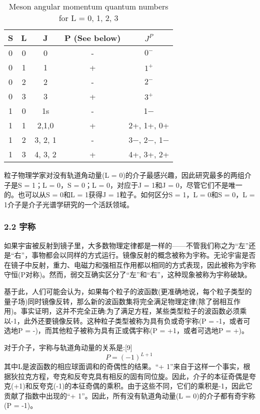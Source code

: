 \begin{table}[ht]
\centering
\caption{Meson angular momentum quantum numbers for L = 0, 1, 2, 3}\label{tab_JZ1}
\begin{tabular}{|c|c|c|c|c|}
\hline
S & L    & J & P
(See below) &$ J^P$ \\
\hline
0 & 0& 0 & - &$ 0^-$\\
\hline
0 & 1 & 1& + & $1^+$ \\
\hline
0 & 2 & 2 & - & $2^-$ \\
\hline
0 & 3 & 3 & + &$3^+$ \\
\hline
1& 0 & 1s & - & 1− \\
\hline
1 &1 & 2,1,0 &+ & 2+, 1+, 0+\\
\hline
1 & 2 & 3, 2, 1 & - & 3−, 2−, 1−  \\
\hline
1 & 3 & 4, 3, 2 & +& 4+, 3+, 2+ \\
\hline
\end{tabular}
\end{table}
粒子物理学家对没有轨道角动量(L = 0)的介子最感兴趣，因此研究最多的两组介子是S = 1；L = 0，S = 0；L = 0，对应于J = 1和J = 0，尽管它们不是唯一的。也可以从S = 0和L = 1获得J = 1粒子。如何区分S = 1，L = 0和S = 0，L = 1介子是介子光谱学研究的一个活跃领域。
\subsubsection{2.2 宇称}
如果宇宙被反射到镜子里，大多数物理定律都是一样的——不管我们称之为“左”还是“右”，事物都会以同样的方式运行。镜像反射的概念被称为宇称。无论宇宙是否在镜子中反射，重力、电磁力和强相互作用都以相同的方式表现，因此被称为宇称守恒(P对称)。然而，弱交互确实区分了“左”和“右”，这种现象被称为宇称破缺。

基于此，人们可能会认为，如果每个粒子的波函数(更准确地说，每个粒子类型的量子场)同时镜像反转，那么新的波函数集将完全满足物理定律(除了弱相互作用)。事实证明，这并不完全正确:为了满足方程，某些类型粒子的波函数必须乘以-1，此外还要镜像反转。这种粒子类型被称为具有负或奇宇称(P = -1，或者可选地P = -)，而其他粒子被称为具有正或偶宇称(P = +1，或者可选地P = +)。

对于介子，宇称与轨道角动量的关系是:[9]\begin{equation}
P=(-1)^{L+1}~
\end{equation}
其中L是波函数的相应球面调和的奇偶性的结果。“+ 1”来自于这样一个事实，根据狄拉克方程，夸克和反夸克具有相反的固有同位旋。因此，介子的本征奇偶是夸克(+1)和反夸克(-1)的本征奇偶的乘积。由于这些不同，它们的乘积是-1，因此它贡献了指数中出现的“+ 1”。因此，所有没有轨道角动量(L = 0)的介子都有奇宇称(P = -1)。

